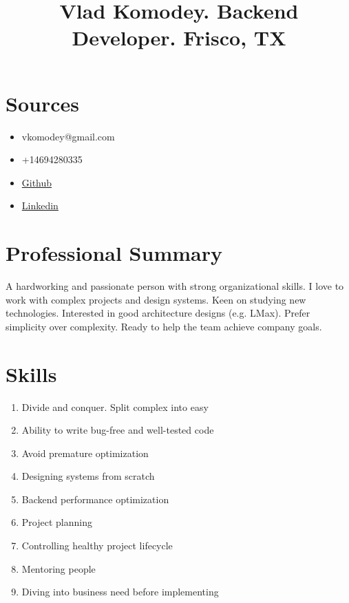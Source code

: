 \documentclass{article}
\title{Vlad Komodey. Backend Developer. Frisco, TX \vspace{-3em}}
\author{}
\date{}
\begin{document}
\maketitle
\thispagestyle{empty}
\section*{Sources\vspace{-0.5em}}
\begin{itemize}
    \item vkomodey@gmail.com
    \item +14694280335
    \item \href{https://github.com/vkomodey}{Github}
    \item \href{https://www.linkedin.com/in/vladislav-komodey-2b1b4aa0/}{Linkedin}
\end{itemize}

\vspace{-1em}

\section*{Professional Summary}

A hardworking and passionate person with strong organizational skills. I
love to work with complex projects and design systems. Keen on studying new
technologies. Interested in good architecture designs (e.g. LMax). Prefer simplicity over complexity.
Ready to help the team achieve company goals.

\vspace{-1.5em}
\section*{Skills}

\begin{multicols}{2}
\begin{enumerate}
    \item Divide and conquer. Split complex into easy
    \item Ability to write bug-free and well-tested code
    \item Avoid premature optimization
    \item Designing systems from scratch
    \item Backend performance optimization
    \item Project planning
    \item Controlling healthy project lifecycle
    \item Mentoring people
    \item Diving into business need before implementing

\end{enumerate}
\end{multicols}
\end{document}
